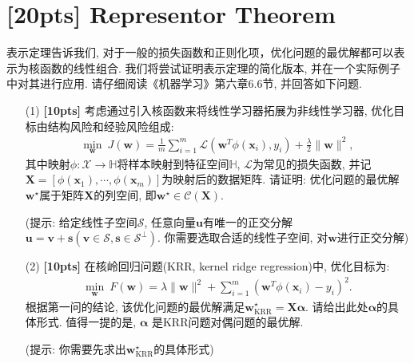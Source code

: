 \documentclass[a4paper,UTF8]{article}
\numberwithin{equation}{section}
\theoremstyle{definition}
\def \X {\boldsymbol{X}}
\def \w {\boldsymbol{w}}
\def \u {\boldsymbol{u}}
\def \v {\boldsymbol{v}}
\def \s {\boldsymbol{s}}
\def \x {\boldsymbol{x}}
\def \boldalpha {\boldsymbol{\alpha}}
\begin{document}
\section{[20pts] Representor Theorem}
表示定理告诉我们, 对于一般的损失函数和正则化项，优化问题的最优解都可以表示为核函数的线性组合. 我们将尝试证明表示定理的简化版本, 
并在一个实际例子中对其进行应用. 请仔细阅读《机器学习》第六章6.6节, 并回答如下问题.
\begin{enumerate}
    \item[(1)] \textbf{[10pts]} 考虑通过引入核函数来将线性学习器拓展为非线性学习器, 优化目标由结构风险和经验风险组成:
    \begin{align*}
        \min_{\w} \  J(\w) = \frac{1}{m} \sum_{i=1}^m \mathcal{L}\left(\w^T \phi(\x_i), y_i \right) + \frac{\lambda}{2}\|\w\|^2,
    \end{align*}
    其中映射$\phi: \mathcal{X} \to \mathbb{H}$将样本映射到特征空间$\mathbb{H}$, $\mathcal{L}$为常见的损失函数,
    并记$\X = \left[\phi(\x_1), \cdots, \phi(\x_m)\right]$为映射后的数据矩阵. 请证明: 优化问题的最优解$\w^\star$属于矩阵$\X$的列空间, 即$\w^\star \in \mathcal{C}(\X)$.

    (提示: 给定线性子空间$\mathcal{S}$, 任意向量$\u$有唯一的正交分解$\u = \v + \s(\v \in \mathcal{S}, \s \in \mathcal{S}^{\perp})$. 你需要选取合适的线性子空间, 对$\w$进行正交分解)
    \item[(2)] \textbf{[10pts]} 在核岭回归问题(KRR, kernel ridge regression)中, 优化目标为:
    \begin{align*}
        \min_{\w} \  F(\w) = \lambda\|\w\|^2+\sum_{i=1}^m\left(\w^T\phi(\x_i)-y_i\right)^2.
    \end{align*}
    根据第一问的结论, 该优化问题的最优解满足$\w_{\text{KRR}}^\star = \X \boldalpha$. 请给出此处$\boldalpha$的具体形式. 值得一提的是, $\boldalpha$
    是KRR问题对偶问题的最优解.

    (提示: 你需要先求出$\w_{\text{KRR}}^\star$的具体形式)
\end{enumerate}
\end{document}
